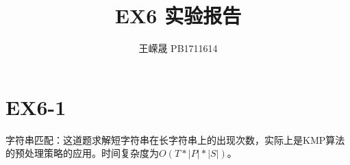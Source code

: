 \documentclass[11pt,a4paper]{article}
\title{EX6 实验报告}
\author{王嵘晟 \quad PB1711614}
\date{}
\begin{document}
	\maketitle
	\section*{EX6-1}
	\par{字符串匹配：这道题求解短字符串在长字符串上的出现次数，实际上是KMP算法的预处理策略的应用。时间复杂度为$O(T*|P|*|S|)$。}
\end{document}
